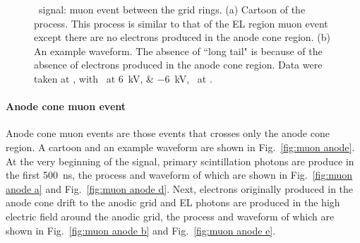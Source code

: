 \begin{figure}[!htbp]
\begin{subfigure}[b]{0.7\textwidth}
		\caption{}
		\label{fig:muon ring b}
	\end{subfigure}
	\caption[\gtest\ signal: muon event between the grid rings.]{\gtest\ signal: muon event between the grid rings. (a) Cartoon of the process. This process is similar to that of the EL region muon event except there are no electrons produced in the anode cone region. (b) An example waveform. The absence of ``long tail"  is because of the absence of electrons produced in the anode cone region. Data were taken at , with \opvtvb\ at \SIlist{+6;-6}{kV}, \opgd\ at \standarddensity .%
	}
	\label{fig:muon ring}
\end{figure}

\paragraph{Anode cone muon event}
\label{sec:events muon anode cone}
Anode cone muon events are those events that crosses only the anode cone region. A cartoon and an example waveform are shown in Fig.~\ref{fig:muon anode}. At the very beginning of the signal, primary scintillation photons are produce in the first \SI{500}{\ns}, the process and waveform of which are shown in Fig.~\ref{fig:muon anode a} and Fig.~\ref{fig:muon anode d}. Next, electrons originally produced in the anode cone drift to the anodic grid and EL photons are produced in the high electric field around the anodic grid, the process and waveform of which are shown in Fig.~\ref{fig:muon anode b} and Fig.~\ref{fig:muon anode e}. 

